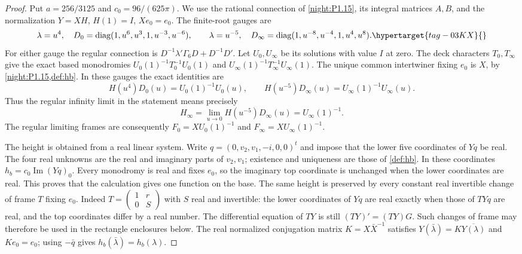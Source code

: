 \documentclass[11pt,a4paper]{article}
\numberwithin{equation}{section}
\theoremstyle{definition}
\begin{document}
\begin{proof}
Put $a=256/3125$ and $c_0=96/(625\pi)$. We use the rational
connection of \cref{night:P1.15}, its integral matrices $A,B$,
and the normalization $Y=XH$, $H(1)=I$, $Xe_0=e_0$.
The finite-root gauges are
\[
 \lambda=u^4,\quad D_0=\operatorname{diag}(1,u^6,u^3,1,u^{-3},u^{-6}),
 \qquad
 \lambda=u^{-5},\quad D_\infty=
 \operatorname{diag}(1,u^{-8},u^{-4},1,u^4,u^8).
 \hypertarget{tag-03KX}{}\label{layout:V:fresh-gauges}
\]
For either gauge the regular connection is
$D^{-1}\lambda'\Gamma_6D+D^{-1}D'$.
Let $U_0,U_\infty$ be its solutions with value $I$ at zero.
The deck characters $T_0,T_\infty$ give the exact based
monodromies $U_0(1)^{-1}T_0^{-1}U_0(1)$ and
$U_\infty(1)^{-1}T_\infty^{-1}U_\infty(1)$.
The unique common intertwiner fixing $e_0$ is $X$, by
\cref{night:P1.15,def:hb}. In these gauges the exact identities are
\[
 H(u^4)D_0(u)=U_0(1)^{-1}U_0(u),\qquad
 H(u^{-5})D_\infty(u)=U_\infty(1)^{-1}U_\infty(u).
\]
Thus the regular infinity limit in the statement means precisely
\[
 H_\infty=\lim_{u\to0}H(u^{-5})D_\infty(u)
             =U_\infty(1)^{-1}.
\]
The regular limiting frames are consequently
$F_0=XU_0(1)^{-1}$ and $F_\infty=XU_\infty(1)^{-1}$.

The height is obtained from a real linear system. Write
$q=(0,v_2,v_1,-i,0,0)^t$ and impose that the lower five
coordinates of $Yq$ be real. The four real unknowns are the
real and imaginary parts of $v_2,v_1$; existence and uniqueness
are those of \cref{def:hb}. In these coordinates
$h_b=c_0\operatorname{Im}(Yq)_0$.
Every monodromy is real and fixes $e_0$, so the imaginary top
coordinate is unchanged when the lower coordinates are real.
This proves that the calculation gives one function on the base.
The same height is preserved by every constant real invertible
change of frame $T$ fixing $e_0$. Indeed
$T=\left(\begin{smallmatrix}1&r\\0&S\end{smallmatrix}\right)$
with $S$ real and invertible: the lower coordinates of $Yq$
are real exactly when those of $TYq$ are real, and the top
coordinates differ by a real number. The differential equation
of $TY$ is still $(TY)'=(TY)G$. Such changes of frame may
therefore be used in the rectangle enclosures below.
The real normalized conjugation matrix $K=X\bar X^{-1}$ satisfies
$Y(\bar\lambda)=K\overline{Y(\lambda)}$ and $Ke_0=e_0$;
using $-\bar q$ gives $h_b(\bar\lambda)=h_b(\lambda)$.


\end{proof}
\end{document}

